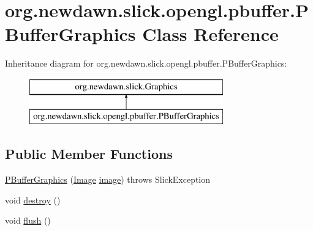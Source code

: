 \hypertarget{classorg_1_1newdawn_1_1slick_1_1opengl_1_1pbuffer_1_1_p_buffer_graphics}{}\section{org.\+newdawn.\+slick.\+opengl.\+pbuffer.\+P\+Buffer\+Graphics Class Reference}
\label{classorg_1_1newdawn_1_1slick_1_1opengl_1_1pbuffer_1_1_p_buffer_graphics}
Inheritance diagram for org.\+newdawn.\+slick.\+opengl.\+pbuffer.\+P\+Buffer\+Graphics\+:\begin{figure}[H]
\begin{center}
\leavevmode
\includegraphics[height=2.000000cm]{classorg_1_1newdawn_1_1slick_1_1opengl_1_1pbuffer_1_1_p_buffer_graphics}
\end{center}
\end{figure}
\subsection*{Public Member Functions}
\begin{DoxyCompactItemize}
\item 
\mbox{\hyperlink{classorg_1_1newdawn_1_1slick_1_1opengl_1_1pbuffer_1_1_p_buffer_graphics_a2fc71983514395eef320ca681dc605f9}{P\+Buffer\+Graphics}} (\mbox{\hyperlink{classorg_1_1newdawn_1_1slick_1_1_image}{Image}} \mbox{\hyperlink{classorg_1_1newdawn_1_1slick_1_1opengl_1_1pbuffer_1_1_p_buffer_graphics_add068041cc793fa55a4019603b988d72}{image}})  throws Slick\+Exception 
\item 
void \mbox{\hyperlink{classorg_1_1newdawn_1_1slick_1_1opengl_1_1pbuffer_1_1_p_buffer_graphics_ac6b3cc6e510c4934bb0d4c6b36e725bc}{destroy}} ()
\item 
void \mbox{\hyperlink{classorg_1_1newdawn_1_1slick_1_1opengl_1_1pbuffer_1_1_p_buffer_graphics_a7360a32bdbc2b16358f1747bf3f25a50}{flush}} ()
\end{DoxyCompactItemize}
